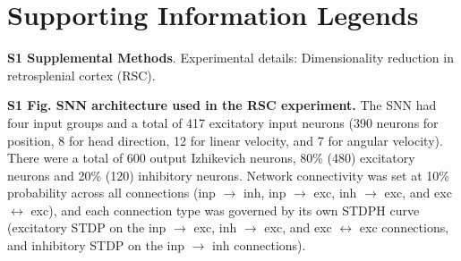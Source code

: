 \section*{Supporting Information Legends}

\textbf{S1 Supplemental Methods}. Experimental details: Dimensionality reduction in retrosplenial cortex (RSC).


\textbf{S1 Fig. \Ac{SNN} architecture used in the RSC experiment.} The \ac{SNN} had four input groups and a total of 417 excitatory input neurons (390 neurons for position, 8 for head direction, 12 for linear velocity, and 7 for angular velocity). There were a total of 600 output Izhikevich neurons, 80\% (480) excitatory neurons and 20\% (120) inhibitory neurons. Network connectivity was set at 10\% probability across all connections (inp $\rightarrow$ inh, inp $\rightarrow$ exc, inh $\rightarrow$ exc, and exc $\leftrightarrow$ exc), and each connection type was governed by its own STDPH curve (excitatory STDP on the inp $\rightarrow$ exc, inh $\rightarrow$ exc, and exc $\leftrightarrow$ exc connections, and inhibitory STDP on the inp $\rightarrow$ inh connections).

